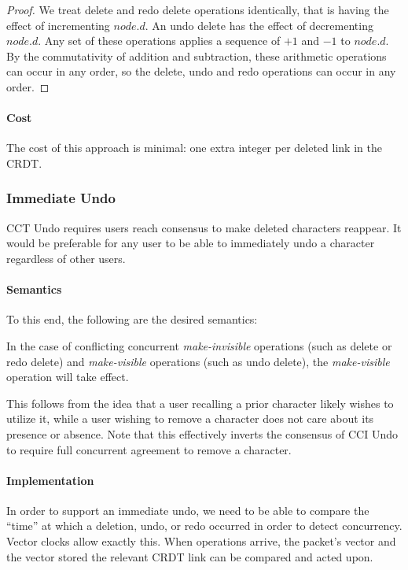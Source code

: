 \documentclass[12pt,a4paper,twoside,openright]{report}
\begin{document}
			\begin{proof}
				We treat delete and redo delete operations identically, that is having the effect of incrementing $node.d$. An undo delete has the effect of decrementing $node.d$. Any set of these operations applies a sequence of $+1$ and $-1$ to $node.d$. By the commutativity of addition and subtraction, these arithmetic operations can occur in any order, so the delete, undo and redo operations can occur in any order.
			\end{proof}
			
			\paragraph{Cost}
			The cost of this approach is minimal: one extra integer per deleted link in the CRDT.
			
		\subsubsection{Immediate Undo} \label{sec:immediateundo}
		CCT Undo requires users reach consensus to make deleted characters reappear. It would be preferable for any user to be able to immediately undo a character regardless of other users.
		
			\paragraph{Semantics}
			To this end, the following are the desired semantics:
			
			In the case of conflicting concurrent \textit{make-invisible} operations (such as delete or redo delete) and \textit{make-visible} operations (such as undo delete), the \textit{make-visible} operation will take effect.
			
			This follows from the idea that a user recalling a prior character likely wishes to utilize it, while a user wishing to remove a character does not care about its presence or absence. Note that this effectively inverts the consensus of CCI Undo to require full concurrent agreement to remove a character. 
			
			\paragraph{Implementation}
			In order to support an immediate undo, we need to be able to compare the ``time'' at which a deletion, undo, or redo occurred in order to detect concurrency. Vector clocks allow exactly this. When operations arrive, the packet's vector and the vector stored the relevant CRDT link can be compared and acted upon.
			
\end{document}
